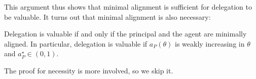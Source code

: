 This argument thus shows that minimal alignment is sufficient for delegation to be valuable.
It turns out that minimal alignment is also necessary:
\begin{proposition}
  Delegation is valuable if and only if the principal and the agent are minimally aligned.
  In particular, delegation is valuable if \(a_P(\theta)\) is weakly increasing in \(\theta\) and \(a_P^\star \in (0, 1)\).
\end{proposition}
The proof for necessity is more involved, so we skip it.
%


